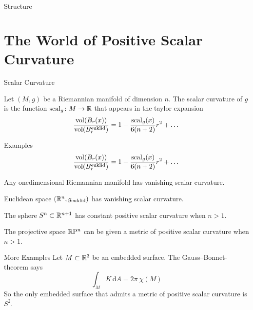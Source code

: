 \documentclass{presis}
\begin{document}
\maketitle

\begin{frame}{Structure}
\tableofcontents
\end{frame}

\section{The World of Positive Scalar Curvature}

\begin{frame}{Scalar Curvature}
    \begin{defi}
Let $(M,g)$ be a Riemannian manifold of dimension $n$.
The scalar curvature of $g$ is the function $\mathrm{scal}_g\colon M\to \mathbb{R}$ that appears in the taylor expansion
\begin{equation*}
    \frac{\mathrm{vol}(B_r(x))}{\mathrm{vol}(B_r^{\text{euklid}})} = 1 - \frac{\mathrm{scal}_g(x)}{6(n+2)}r^2 + \dots
\end{equation*}
\end{defi}
\end{frame}

\begin{frame}{Examples}
    $$\frac{\mathrm{vol}(B_r(x))}{\mathrm{vol}(B_r^{\text{euklid}})} = 1 - \frac{\mathrm{scal}_g(x)}{6(n+2)}r^2 + \dots$$\pause
    \begin{vfilleditems}
    \item Any onedimensional Riemannian manifold has vanishing scalar curvature.\pause
    \item Euclidean space $(\mathbb{R}^n,g_{\text{euklid}})$ has vanishing scalar curvature.\pause
    \item The sphere $S^n\subset\mathbb{R}^{n+1}$ has constant positive scalar curvature when $n>1$.\pause
    \item The projective space $\mathbb{R}\mathrm{P}^n$ can be given a metric of positive scalar curvature when $n>1$.
    \end{vfilleditems}
\end{frame}

\begin{frame}{More Examples}
    Let $M\subset \mathbb{R}^3$ be an embedded surface.\pause
    The Gauss--Bonnet-theorem says 
    \begin{equation*}
        \int_M K \,\mathrm{d}A = 2\pi \:\chi(M)
    \end{equation*}\pause
    So the only embedded surface that admits a metric of positive scalar curvature is $S^2$.
\end{frame}
\end{document}
